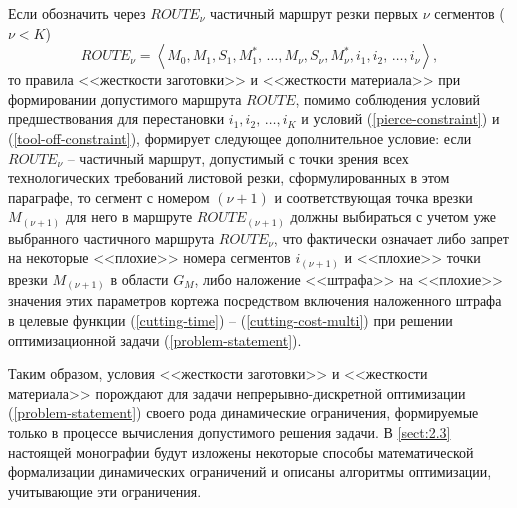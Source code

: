 Если обозначить через
$ROUTE_\nu$
частичный маршрут резки первых $\nu$
сегментов
($\nu < K$)
$$
  ROUTE_\nu = \left<
    M_0, M_1, S_1, M_1^*, \,\dots, M_\nu, S_\nu, M_\nu^*,
    i_1, i_2, \,\dots, i_\nu
  \right>
  ,
$$
то правила <<жесткости заготовки>> и <<жесткости материала>>
при формировании допустимого маршрута
$ROUTE$,
помимо соблюдения условий предшествования для перестановки
$i_1, i_2, \,\dots, i_K$
и условий (\ref{pierce-constraint}) и (\ref{tool-off-constraint}),
формирует следующее дополнительное условие:
если
$ROUTE_\nu$ -- частичный маршрут,
допустимый с точки зрения всех технологических
требований листовой резки,
сформулированных в этом параграфе,
то сегмент с номером $(\nu+1)$
и соответствующая точка врезки $M_{(\nu+1)}$
для него в маршруте
$ROUTE_{(\nu+1)}$
должны выбираться с учетом уже выбранного частичного маршрута
$ROUTE_\nu$,
что фактически означает либо запрет
на некоторые <<плохие>> номера сегментов
$i_{(\nu+1)}$
и <<плохие>> точки врезки
$M_{(\nu+1)}$
в области  $G_M$,
либо наложение <<штрафа>> на <<плохие>> значения
этих параметров кортежа
посредством включения наложенного штрафа в целевые функции
(\ref{cutting-time}) -- (\ref{cutting-cost-multi})
при решении оптимизационной задачи (\ref{problem-statement}).

Таким образом,
условия <<жесткости заготовки>> и <<жесткости материала>>
порождают для задачи непрерывно-дискретной оптимизации (\ref{problem-statement})
своего рода динамические ограничения,
формируемые только в процессе вычисления допустимого решения задачи.
В \ref{sect:2.3}
настоящей монографии будут изложены
некоторые способы математической формализации динамических ограничений
и описаны алгоритмы оптимизации,
учитывающие эти ограничения.
